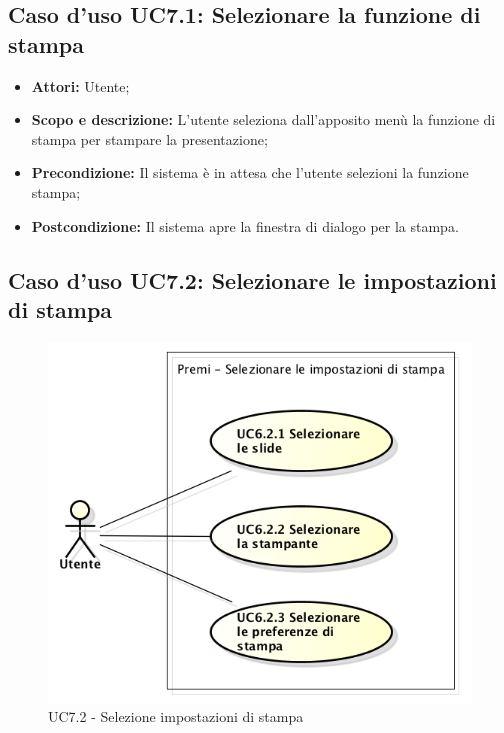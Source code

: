 \subsection{Caso d'uso UC7.1: Selezionare la funzione di stampa}
\begin{itemize}
	\item \textbf{Attori:} Utente;
	\item \textbf{Scopo e descrizione:} L'utente seleziona dall'apposito menù la funzione di stampa per stampare la presentazione;
	\item \textbf{Precondizione:} Il sistema è in attesa che l'utente selezioni la funzione stampa;
	\item \textbf{Postcondizione:} Il sistema apre la finestra di dialogo per la stampa.
\end{itemize}

\subsection{Caso d'uso UC7.2: Selezionare le impostazioni di stampa}
\begin{figure}[h] 
	\centering 
	\includegraphics[scale=0.45] {img/UC7.2.png} 
	\caption{UC7.2 - Selezione impostazioni di stampa} 
\end{figure}

